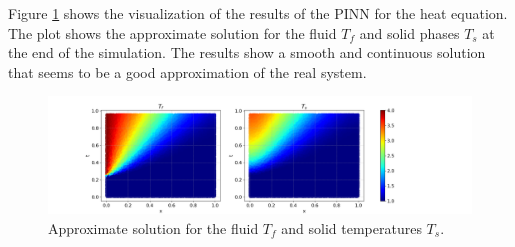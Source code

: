 \documentclass[unicode,11pt,a4paper,oneside,numbers=endperiod,openany]{scrartcl}
\begin{document}
Figure \ref{fig:task1} shows the visualization of the results of the PINN for
the heat equation. The plot shows the approximate solution for the fluid $T_f$
and solid phases $T_s$ at the end of the simulation. The results show a smooth
and continuous solution that seems to be a good approximation of the real system.
\begin{figure}[h]
    \centering
    \includegraphics[width=1.2\textwidth]{../Proj1_Y24/Task1/output.png}
    \caption{Approximate solution for the fluid $T_f$ and solid temperatures $T_s$.}
    \label{fig:task1}
\end{figure}
\end{document}
